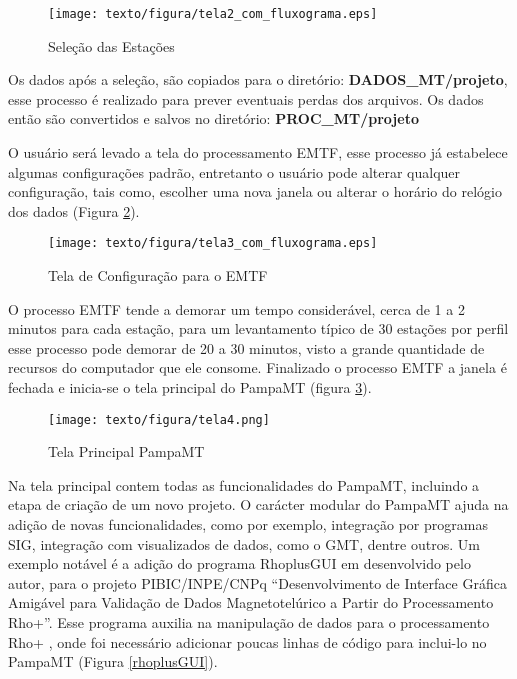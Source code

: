     \begin{figure}[H]
        \caption{Seleção das Estações}
            \begin{center}
                \texttt{[image: texto/figura/tela2\_com\_fluxograma.eps]}
            \end{center}
        \label{tela_sel_site}
    \end{figure}
    
    Os dados após a seleção, são copiados para o diretório: \textbf{DADOS\_MT/projeto}, esse processo é realizado para prever eventuais perdas dos arquivos. Os dados então são convertidos e salvos no diretório: \textbf{PROC\_MT/projeto} 
    
    O usuário será levado a tela do processamento EMTF, esse processo já estabelece algumas configurações padrão, entretanto o usuário pode alterar qualquer configuração, tais como, escolher uma nova janela ou alterar o horário do relógio dos dados (Figura \ref{conf-procZ}).
    
    \begin{figure}[H]
        \caption{Tela de Configuração para o EMTF}
            \begin{center}
                \texttt{[image: texto/figura/tela3\_com\_fluxograma.eps]}
            \end{center}
        \label{conf-procZ}
    \end{figure}
    
    O processo EMTF tende a demorar um tempo considerável, cerca de 1 a 2 minutos para cada estação, para um levantamento típico de 30 estações por perfil esse processo pode demorar de 20 a 30 minutos, visto a grande quantidade de recursos do computador que ele consome. Finalizado o processo EMTF a janela é fechada e inicia-se o tela principal do PampaMT (figura \ref{tela-prin}).
    
    \begin{figure}[H]
        \caption{Tela Principal PampaMT}
            \begin{center}
                \texttt{[image: texto/figura/tela4.png]}
            \end{center}
        \label{tela-prin}
    \end{figure}
    
    
    Na tela principal contem todas as funcionalidades do PampaMT, incluindo a etapa de criação de um novo projeto. O carácter modular do PampaMT ajuda na adição de novas funcionalidades, como por exemplo, integração por programas SIG, integração com visualizados de dados, como o GMT, dentre outros. Um exemplo notável é a adição do programa RhoplusGUI em desenvolvido pelo autor, para o projeto PIBIC/INPE/CNPq ``Desenvolvimento de Interface Gráfica Amigável para Validação de Dados Magnetotelúrico a Partir do Processamento Rho+''. Esse programa auxilia na manipulação de dados para o processamento Rho+ \cite{parker1996optimal}, onde foi necessário adicionar poucas linhas de código para inclui-lo no PampaMT (Figura \ref{rhoplusGUI}).
    
